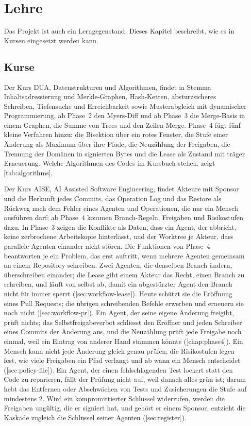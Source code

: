 \chapter[chap:teaching]{Lehre}

Das Projekt ist auch ein Lerngegenstand. Dieses Kapitel beschreibt, wie es in Kursen
eingesetzt werden kann.

\section{Kurse}

Der Kurs DUA, Datenstrukturen und Algorithmen, findet in Stemma Inhaltsadressierung
und Merkle-Graphen, Hash-Ketten, absturzsicheres Schreiben, Tiefensuche und Erreichbarkeit
sowie Musterabgleich mit dynamischer Programmierung, ab Phase~2 den Myers-Diff
und ab Phase~3 die Merge-Basis in einem Graphen, die Summe von Trees und den Zeilen-Merge.
Phase~4 fügt fünf kleine Verfahren hinzu: die Bisektion über ein rotes Fenster,
die Stufe einer Änderung als Maximum über ihre Pfade, die Neuzählung der Freigaben,
die Trennung der Domänen in signierten Bytes und die Lease als Zustand mit träger Erneuerung.
Welche Algorithmen des Codes im Kursbuch stehen, zeigt [tab:algorithms].

Der Kurs AISE, AI Assisted Software Engineering, findet Akteure mit Sponsor und die Herkunft
jedes Commits, das Operation Log und das Restore als Rückweg nach dem Fehler eines Agenten
und Operationen, die nur ein Mensch ausführen darf; ab Phase~4 kommen Branch-Regeln,
Freigaben und Risikostufen dazu.
In Phase~3 zeigen die Konflikte als Daten, dass ein Agent, der abbricht, keine zerbrochene
Arbeitskopie hinterlässt, und der Worktree je Akteur,
dass parallele Agenten einander nicht stören.
Die Funktionen von Phase~4 beantworten je ein Problem, das erst auftritt,
wenn mehrere Agenten gemeinsam an einem Repository schreiben.
Zwei Agenten, die denselben Branch ändern, überschreiben einander;
die Lease gibt einem Akteur das Recht, einen Branch zu schreiben, und läuft von selbst ab,
damit ein abgestürzter Agent den Branch nicht für immer sperrt
([sec:workflow-lease]).
Heute schützt sie die Eröffnung eines Pull Requests; die übrigen schreibenden Befehle
erwerben und erneuern sie noch nicht ([sec:workflow-pr]).
Ein Agent, der seine eigene Änderung freigibt, prüft nichts;
das Selbstfreigabeverbot schliesst den Eröffner und jeden Schreiber eines Commits
der Änderung aus, und die Neuzählung prüft jede Freigabe noch einmal,
weil ein Eintrag von anderer Hand stammen könnte ([chap:phase4]).
Ein Mensch kann nicht jede Änderung gleich genau prüfen;
die Risikostufen legen fest, wie viele Freigaben ein Pfad verlangt
und ab wann ein Mensch entscheidet ([sec:policy-file]).
Ein Agent, der einen fehlschlagenden Test lockert statt den Code zu reparieren,
fällt der Prüfung nicht auf, weil danach alles grün ist;
darum hebt das Entfernen oder Abschwächen von Tests und Zusicherungen die Stufe auf mindestens 2.
Wird ein kompromittierter Schlüssel widerrufen, werden die Freigaben ungültig,
die er signiert hat, und gehört er einem Sponsor,
entzieht die Kaskade zugleich die Schlüssel seiner Agenten
([sec:register]).

